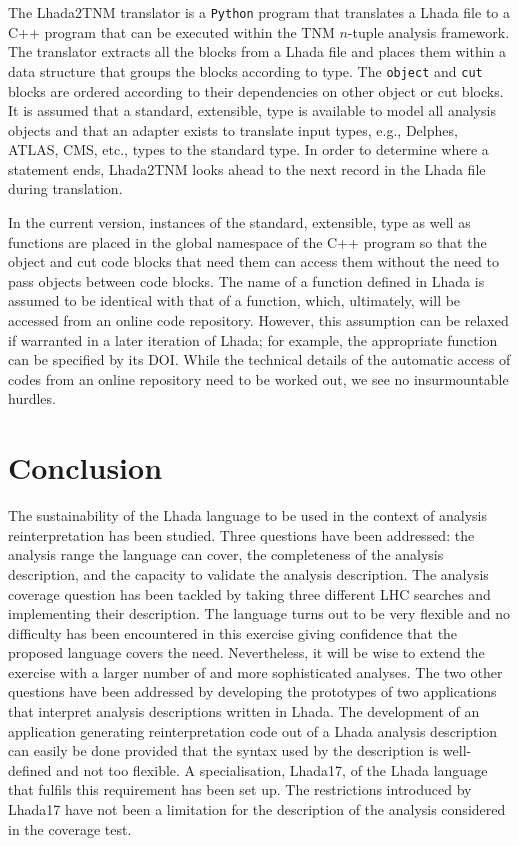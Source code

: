 \documentclass[11pt]{cernrep}
\begin{document}
The {\sc Lhada2TNM} translator is a {\tt Python} program that translates a {\sc Lhada} file to a C++ program that can be executed within the {\sc TNM} $n$-tuple analysis framework. The translator extracts all the blocks from a {\sc Lhada} file and places them within a data structure that groups the blocks according to type. The {\tt object} and {\tt cut} blocks are ordered according to their dependencies on other object or cut blocks. It is assumed that a standard, extensible, type is available to model all analysis objects and that an adapter exists to translate input types, e.g., {\sc Delphes}, {\sc ATLAS}, {\sc CMS}, etc., types  to the standard type. In order to determine where a statement ends, {\sc Lhada2TNM} looks ahead to the next record in the {\sc Lhada} file during translation.

In the current version, instances of the standard, extensible, type as well as functions are placed in the global namespace of the C++ program so that the object and cut code blocks
that need them can access them without the need to pass objects between code blocks. The name of a function defined in {\sc Lhada} is assumed  to be identical with that of a function, which, ultimately, will be accessed from an online code repository. However, this assumption can be relaxed if warranted in a later iteration of {\sc Lhada}; for example, the appropriate function can be specified by its {\sc DOI}.  While the technical details of the automatic access of
codes from an online repository need to be worked out, we see no insurmountable hurdles.


\section{Conclusion}

The sustainability of the {\sc Lhada} language to be used in the context of analysis reinterpretation has been studied. Three questions have been addressed: the analysis range the language can cover, the completeness of the analysis description, and the capacity to validate the analysis description. The analysis coverage question has been tackled by taking three different LHC searches and implementing their description. The language turns out to be very flexible and no difficulty has been encountered in this exercise giving confidence that the proposed language covers the need. Nevertheless, it will be wise to extend the exercise with a larger number of and more sophisticated analyses. The two other questions have been addressed by developing the prototypes of two applications that interpret analysis descriptions written in {\sc Lhada}. The development of an application generating reinterpretation code out of a {\sc Lhada} analysis description can easily be done provided that the syntax used by the description is well-defined and not too flexible. A specialisation, {\sc Lhada17}, of the {\sc Lhada} language that fulfils this requirement has been set up. The restrictions introduced by {\sc Lhada17} have not been a limitation for the description of the analysis considered in the coverage test. 
\end{document}
